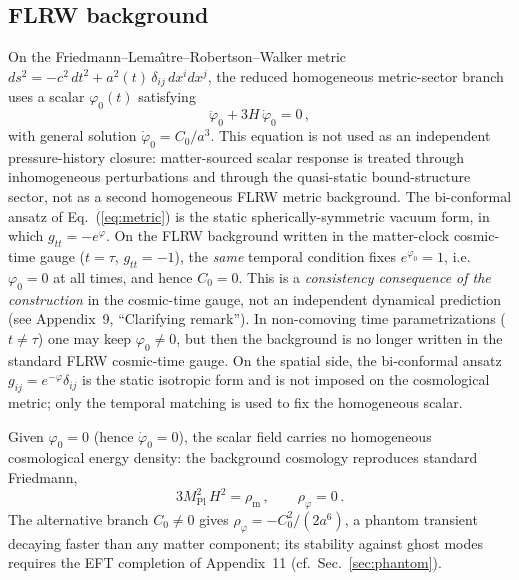 \documentclass[aps,prd,onecolumn,superscriptaddress,nofootinbib,showpacs,12pt]{revtex4-2}
\newcommand{\Mpl}{M_{\mathrm{Pl}}}
\begin{document}
\subsection{FLRW background}\label{sec:flrw}

On the Friedmann--Lema\^{\i}tre--Robertson--Walker metric
$ds^{2} = -c^{2}\,dt^{2} + a^{2}(t)\,\delta_{ij}\,dx^{i}dx^{j}$,
the reduced homogeneous metric-sector branch uses a scalar
$\varphi_{0}(t)$ satisfying
\begin{equation}\label{eq:flrw_scalar}
  \ddot{\varphi}_{0} + 3H\,\dot{\varphi}_{0} = 0\,,
\end{equation}
with general solution $\dot{\varphi}_{0} = C_{0}/a^{3}$.
This equation is not used as an independent pressure-history
closure: matter-sourced scalar response is treated through
inhomogeneous perturbations and through the quasi-static
bound-structure sector, not as a second homogeneous FLRW
metric background.
The bi-conformal ansatz of Eq.~(\ref{eq:metric}) is the
static spherically-symmetric vacuum form, in which
$g_{tt} = -e^{\varphi}$.  On the FLRW background written
in the matter-clock cosmic-time gauge ($t = \tau$,
$g_{tt} = -1$), the \emph{same} temporal condition
fixes $e^{\varphi_{0}} = 1$, i.e.\ $\varphi_{0} = 0$
at all times, and hence $C_{0} = 0$.  This is a
\emph{consistency consequence of the construction} in
the cosmic-time gauge, not an independent dynamical
prediction (see Appendix~9, ``Clarifying remark'').
In non-comoving time parametrizations ($t \neq \tau$)
one may keep $\varphi_{0} \neq 0$, but then the
background is no longer written in the standard FLRW
cosmic-time gauge.  On the spatial side, the
bi-conformal ansatz $g_{ij} = e^{-\varphi}\delta_{ij}$
is the static isotropic form and is not imposed on the
cosmological metric; only the temporal matching is used
to fix the homogeneous scalar.

Given $\varphi_{0} = 0$ (hence $\dot{\varphi}_{0} = 0$),
the scalar field carries no homogeneous cosmological
energy density: the background cosmology reproduces
standard Friedmann,
\begin{equation}\label{eq:friedmann}
  3\Mpl^{2}\,H^{2} = \rho_{\mathrm{m}}\,,\qquad
  \rho_{\varphi} = 0\,.
\end{equation}
The alternative branch $C_{0} \neq 0$ gives
$\rho_{\varphi} = -C_{0}^{2}/(2a^{6})$, a phantom
transient decaying faster than any matter component; its
stability against ghost modes requires the EFT
completion of Appendix~11 (cf.\ Sec.~\ref{sec:phantom}).
\end{document}
